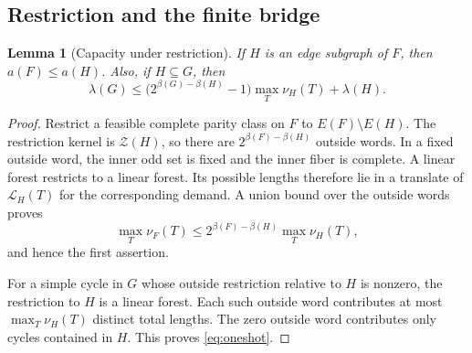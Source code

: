 \documentclass[11pt,a4paper]{article}
\numberwithin{equation}{section}
\newtheorem{lemma}[theorem]{Lemma}
\theoremstyle{definition}
\theoremstyle{remark}
\newcommand{\cZ}{\mathcal Z}
\begin{document}
\subsection{Restriction and the finite bridge}
\begin{lemma}[Capacity under restriction]\label{lem:monotonicity}
If $H$ is an edge subgraph of $F$, then $a(F)\le a(H)$. Also, if $H\subseteq G$, then
\begin{equation}\label{eq:oneshot}
 \lambda(G)\le\bigl(2^{\beta(G)-\beta(H)}-1\bigr)
                   \max_T\nu_H(T)+\lambda(H).
\end{equation}
\end{lemma}
\begin{proof}
Restrict a feasible complete parity class on $F$ to $E(F)\setminus E(H)$. The restriction kernel is $\cZ(H)$, so there are $2^{\beta(F)-\beta(H)}$ outside words. In a fixed outside word, the inner odd set is fixed and the inner fiber is complete. A linear forest restricts to a linear forest. Its possible lengths therefore lie in a translate of $\mathcal L_H(T)$ for the corresponding demand. A union bound over the outside words proves
\[
 \max_T\nu_F(T)\le2^{\beta(F)-\beta(H)}\max_T\nu_H(T),
\]
and hence the first assertion.

For a simple cycle in $G$ whose outside restriction relative to $H$ is nonzero, the restriction to $H$ is a linear forest. Each such outside word contributes at most $\max_T\nu_H(T)$ distinct total lengths. The zero outside word contributes only cycles contained in $H$. This proves \eqref{eq:oneshot}.
\end{proof}
\end{document}
